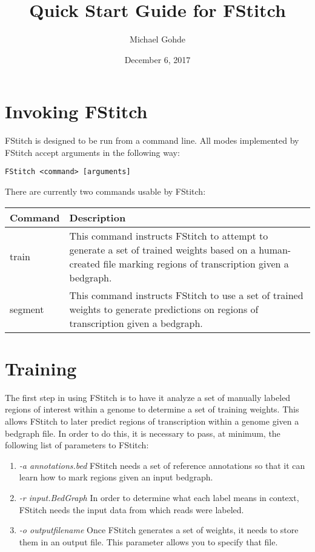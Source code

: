 \documentclass[12pt,letterpaper]{article}
\begin{document}
\title{Quick Start Guide for FStitch}
\author{Michael Gohde}
\date{December 6, 2017}
\maketitle


\section{Invoking FStitch}
FStitch is designed to be run from a command line. All modes implemented by FStitch accept arguments in the following way:

\begin{verbatim}
FStitch <command> [arguments]
\end{verbatim}

There are currently two commands usable by FStitch:

\begin{tabular}{| l | p{8cm} |}
 \hline
 \textbf{Command} & \textbf{Description}\\
 \hline
 train & This command instructs FStitch to attempt to generate a set of trained weights based on a human-created file marking regions of transcription given a bedgraph.\\
 \hline
 segment & This command instructs FStitch to use a set of trained weights to generate predictions on regions of transcription given a bedgraph.\\
 \hline
\end{tabular}

\section{Training}
The first step in using FStitch is to have it analyze a set of manually labeled regions of interest within a genome to determine a set of training weights.
This allows FStitch to later predict regions of transcription within a genome given a bedgraph file. In order to do this, it is necessary to pass, at minimum,
the following list of parameters to FStitch:

\begin{enumerate}
 \item \textit{-a annotations.bed} FStitch needs a set of reference annotations so that it can learn how to mark regions given an input bedgraph.
 \item \textit{-r input.BedGraph} In order to determine what each label means in context, FStitch needs the input data from which reads were labeled.
 \item \textit{-o outputfilename} Once FStitch generates a set of weights, it needs to store them in an output file. This parameter allows you to specify that file.
\end{enumerate}
\end{document}
